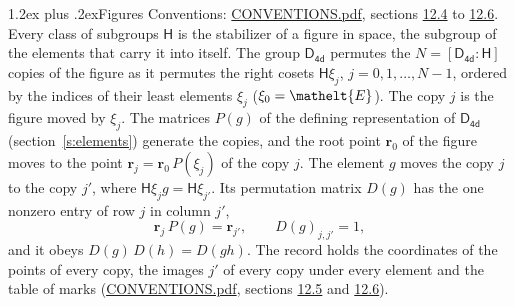 \documentclass[10pt,a4paper]{article}
\makeatletter
\renewcommand\section{\@startsection{section}{1}{\z@}{-3ex plus -1ex minus -.2ex}%
  {1.2ex plus .2ex}{\normalfont\large\sffamily\bfseries\color{parttitle}}}
\numberwithin{equation}{section}
\newcommand{\eltfont}[1]{{\let\sigma\eltsigma\mathelt{#1}}}
\newcommand{\grp}[1]{\mathsf{#1}}
\newcommand{\cls}[1]{\eltfont{#1}}
\newcommand{\pointr}{\mathbf{r}}
\makeatother
\begin{document}
\section{Figures}\label{s:permutation}
Conventions: \href{../../CONVENTIONS.pdf}{CONVENTIONS.pdf}, sections \href{../../CONVENTIONS.pdf\#conv.12.4}{12.4} to \href{../../CONVENTIONS.pdf\#conv.12.6}{12.6}.
Every class of subgroups $\grp{H}$ is the stabilizer of a figure in space, the subgroup of the elements that carry it into itself. \label{n:local.orbit.size}\label{n:element.coset.least}\label{n:index.coset}The group $\grp{D_{4d}}$ permutes the $N = [\grp{D_{4d}} : \grp{H}]$ copies of the figure as it permutes the right cosets $\grp{H}\xi_j$, $j = 0, 1, \dots, N - 1$, ordered by the indices of their least elements $\xi_j$ ($\xi_0 = \cls{E}$). The copy $j$ is the figure moved by $\xi_j$. The matrices $P(g)$ of the defining representation of $\grp{D_{4d}}$ (section~\ref{s:elements}) generate the copies, and the root point $\pointr_0$ of the figure moves to the point $\pointr_j = \pointr_0\, P(\xi_j)$ of the copy $j$. \label{n:local.coset.image}The element $g$ moves the copy $j$ to the copy $j'$, where $\grp{H}\xi_j g = \grp{H}\xi_{j'}$. \label{n:local.matrix.permutation}Its permutation matrix $D(g)$ has the one nonzero entry of row $j$ in column $j'$,
\begin{equation}\label{e:perm.matrix}\pointr_j\, P(g) = \pointr_{j'}, \qquad D(g)_{j,j'} = 1,\end{equation}
and it obeys $D(g)\, D(h) = D(gh)$. The record holds the coordinates of the points of every copy, the images $j'$ of every copy under every element and the table of marks (\href{../../CONVENTIONS.pdf}{CONVENTIONS.pdf}, sections \href{../../CONVENTIONS.pdf\#conv.12.5}{12.5} and \href{../../CONVENTIONS.pdf\#conv.12.6}{12.6}).
\end{document}
